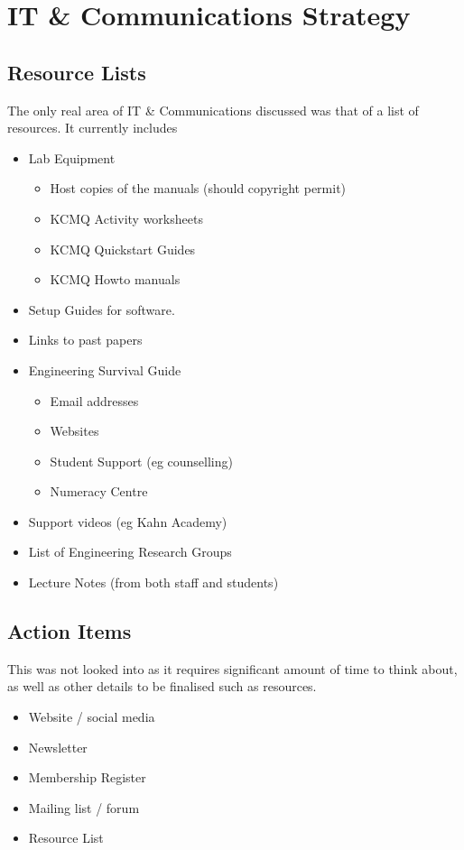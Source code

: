 \section{IT \& Communications Strategy}
\label{sec:ITComms}
\subsection{Resource Lists}
The only real area of IT \& Communications discussed was that of a list of
resources. It currently includes
\begin{itemize}
  \item Lab Equipment
  \begin{itemize}
    \item Host copies of the manuals (should copyright permit)
    \item KCMQ Activity worksheets
    \item KCMQ Quickstart Guides
    \item KCMQ Howto manuals
   \end{itemize}
  \item Setup Guides for software.
  \item Links to past papers
  \item Engineering Survival Guide
  \begin{itemize}
    \item Email addresses
    \item Websites
    \item Student Support (eg counselling)
    \item Numeracy Centre
  \end{itemize}
  \item Support videos (eg Kahn Academy)
  \item List of Engineering Research Groups
  \item Lecture Notes (from both staff and students)
\end{itemize}

\subsection{Action Items}
This was not looked into as it requires significant amount of time to think
about, as well as other details to be finalised such as resources. 
\begin{itemize}
  \item Website / social media
  \item Newsletter
  \item Membership Register
  \item Mailing list / forum
  \item Resource List
\end{itemize}